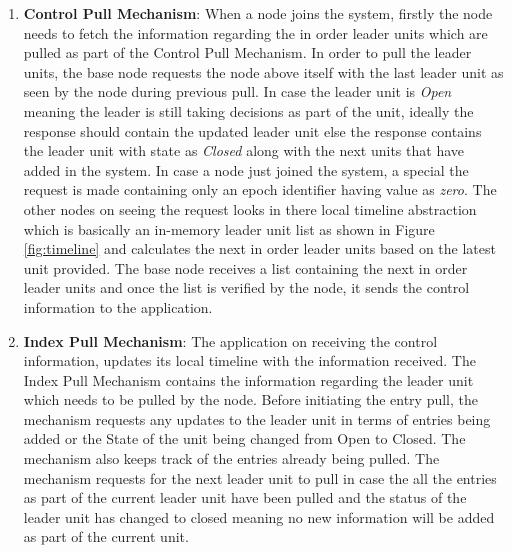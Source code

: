 \documentclass[a4paper,11pt]{kth-mag}
\begin{document}
\begin{enumerate}

\item \textbf{Control Pull Mechanism}: When a node joins the system, firstly the node needs to fetch the information regarding the in order leader units which are pulled as part of the Control Pull Mechanism. In order to pull the leader units, the base node requests the node above itself with the last leader unit as seen by the node during previous pull. In case the leader unit is \textit{Open} meaning the leader is still taking decisions as part of the unit, ideally the response should contain the updated leader unit else the response contains the leader unit with state as \textit{Closed} along with the next units that have added in the system. In case a node just joined the system, a special the request is made containing only an epoch identifier having value as \textit{zero}. The other nodes on seeing the request looks in there local timeline abstraction which is basically an in-memory leader unit list as shown in Figure \ref{fig:timeline} and calculates the next in order leader units based on the latest unit provided. The base node receives a list containing the next in order leader units and once the list is verified by the node, it sends the control information to the application.

\item \textbf{Index Pull Mechanism}: The application on receiving the control information, updates its local timeline with the information received. The Index Pull Mechanism contains the information regarding the leader unit which needs to be pulled by the node. Before initiating the entry pull, the mechanism requests any updates to the leader unit in terms of entries being added or the State of the unit being changed from Open to Closed. The mechanism also keeps track of the entries already being pulled. The mechanism requests for the next leader unit to pull in case the all the entries as part of the current leader unit have been pulled and the status of the leader unit has changed to closed meaning no new information will be added as part of the current unit.

\end{enumerate}
\end{document}
